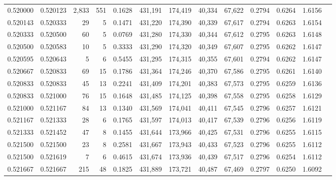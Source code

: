 \begin{tabular}{rrrrrrrrrrrrr}
0.520000 & 0.520123 & 2,833 & 551 &                                     0.1628 & 431,191 & 174,419 &  40,334 &  67,622 & 0.2794 & 0.6264 & 1.6156 \\
0.520143 & 0.520333 &    29 &   5 &                                     0.1471 & 431,220 & 174,390 &  40,339 &  67,617 & 0.2794 & 0.6263 & 1.6154 \\
0.520333 & 0.520500 &    60 &   5 &                                     0.0769 & 431,280 & 174,330 &  40,344 &  67,612 & 0.2795 & 0.6263 & 1.6148 \\
0.520500 & 0.520583 &    10 &   5 &                                     0.3333 & 431,290 & 174,320 &  40,349 &  67,607 & 0.2795 & 0.6262 & 1.6147 \\
0.520595 & 0.520643 &     5 &   6 &                                     0.5455 & 431,295 & 174,315 &  40,355 &  67,601 & 0.2794 & 0.6262 & 1.6147 \\
0.520667 & 0.520833 &    69 &  15 &                                     0.1786 & 431,364 & 174,246 &  40,370 &  67,586 & 0.2795 & 0.6261 & 1.6140 \\
0.520833 & 0.520833 &    45 &  13 &                                     0.2241 & 431,409 & 174,201 &  40,383 &  67,573 & 0.2795 & 0.6259 & 1.6136 \\
0.520833 & 0.521000 &    76 &  15 &                                     0.1648 & 431,485 & 174,125 &  40,398 &  67,558 & 0.2795 & 0.6258 & 1.6129 \\
0.521000 & 0.521167 &    84 &  13 &                                     0.1340 & 431,569 & 174,041 &  40,411 &  67,545 & 0.2796 & 0.6257 & 1.6121 \\
0.521167 & 0.521333 &    28 &   6 &                                     0.1765 & 431,597 & 174,013 &  40,417 &  67,539 & 0.2796 & 0.6256 & 1.6119 \\
0.521333 & 0.521452 &    47 &   8 &                                     0.1455 & 431,644 & 173,966 &  40,425 &  67,531 & 0.2796 & 0.6255 & 1.6115 \\
0.521500 & 0.521500 &    23 &   8 &                                     0.2581 & 431,667 & 173,943 &  40,433 &  67,523 & 0.2796 & 0.6255 & 1.6112 \\
0.521500 & 0.521619 &     7 &   6 &                                     0.4615 & 431,674 & 173,936 &  40,439 &  67,517 & 0.2796 & 0.6254 & 1.6112 \\
0.521667 & 0.521667 &   215 &  48 &                                     0.1825 & 431,889 & 173,721 &  40,487 &  67,469 & 0.2797 & 0.6250 & 1.6092 \\

\end{tabular}
